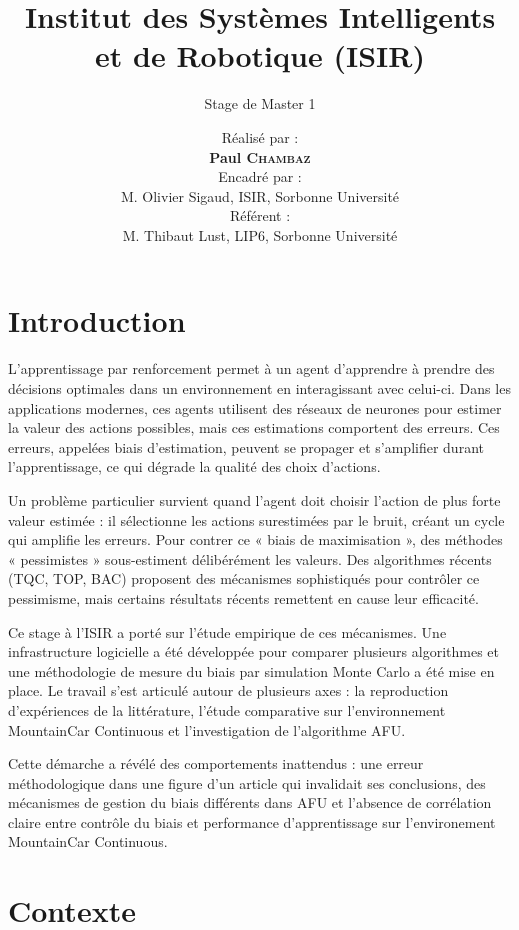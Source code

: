 \documentclass[a4paper, 12pt]{report}
\institute{Sorbonne Université}
\title{Institut des Systèmes Intelligents et de Robotique (ISIR)}
\subtitle{Stage de Master 1}
\author{ Réalisé par : \\[0.5cm]
		\textbf{Paul \textsc{Chambaz}    }       \\[1cm]
		Encadré par :        \\
		M. Olivier Sigaud, ISIR, Sorbonne Université \\[1cm]
		Référent  :        \\
		M. Thibaut Lust, LIP6, Sorbonne Université
		 }
\begin{document}
    \maketitle
    \romantableofcontents

    \chapter{Introduction}

    L'apprentissage par renforcement permet à un agent d'apprendre à prendre
    des décisions optimales dans un environnement en interagissant avec
    celui-ci. Dans les applications modernes, ces agents utilisent des réseaux
    de neurones pour estimer la valeur des actions possibles, mais ces
    estimations comportent des erreurs. Ces erreurs, appelées biais
    d'estimation, peuvent se propager et s'amplifier durant l'apprentissage,
    ce qui dégrade la qualité des choix d'actions.

    Un problème particulier survient quand l'agent doit choisir l'action de
    plus forte valeur estimée : il sélectionne les actions
    surestimées par le bruit, créant un cycle qui amplifie les erreurs. Pour
    contrer ce « biais de maximisation », des méthodes « pessimistes »
    sous-estiment délibérément les valeurs. Des algorithmes récents (TQC, TOP,
    BAC) proposent des mécanismes sophistiqués pour contrôler ce pessimisme,
    mais certains résultats récents remettent en cause leur efficacité.

    Ce stage à l'ISIR a porté sur l'étude empirique de ces mécanismes. Une
    infrastructure logicielle a été développée pour comparer plusieurs
    algorithmes et une méthodologie de mesure du biais par simulation Monte
    Carlo a été mise en place. Le travail s'est articulé autour de plusieurs
    axes : la reproduction d'expériences de la littérature, l'étude comparative
    sur l'environnement MountainCar Continuous et l'investigation de
    l'algorithme AFU.

    Cette démarche a révélé des comportements inattendus : une erreur
    méthodologique dans une figure d'un article qui invalidait ses
    conclusions, des mécanismes de gestion du biais différents
    dans AFU et l'absence de corrélation claire entre contrôle du biais et
    performance d'apprentissage sur l'environement MountainCar Continuous.

    \chapter{Contexte}
\end{document}
